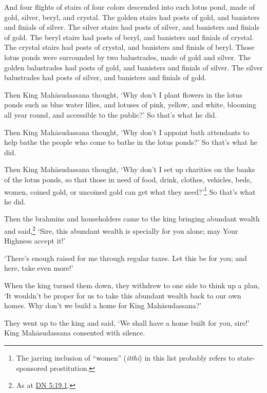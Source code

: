 \documentclass[12pt,openany]{book}%
\begin{document}
And four flights of stairs of four colors descended into each lotus pond, made of gold, silver, beryl, and crystal. The golden stairs had posts of gold, and banisters and finials of silver. The silver stairs had posts of silver, and banisters and finials of gold. The beryl stairs had posts of beryl, and banisters and finials of crystal. The crystal stairs had posts of crystal, and banisters and finials of beryl. Those lotus ponds were surrounded by two balustrades, made of gold and silver. The golden balustrades had posts of gold, and banisters and finials of silver. The silver balustrades had posts of silver, and banisters and finials of gold. 

Then King \textsanskrit{Mahāsudassana} thought, ‘Why don’t I plant flowers in the lotus ponds such as blue water lilies, and lotuses of pink, yellow, and white, blooming all year round, and accessible to the public?’ So that’s what he did. 

Then King \textsanskrit{Mahāsudassana} thought, ‘Why don’t I appoint bath attendants to help bathe the people who come to bathe in the lotus ponds?’ So that’s what he did. 

Then King \textsanskrit{Mahāsudassana} thought, ‘Why don’t I set up charities on the banks of the lotus ponds, so that those in need of food, drink, clothes, vehicles, beds, women, coined gold, or uncoined gold can get what they need?’\footnote{The jarring inclusion of “women” (\textit{\textsanskrit{itthī}}) in this list probably refers to state-sponsored prostitution. } So that’s what he did. 

Then the brahmins and householders came to the king bringing abundant wealth and said,\footnote{As at \href{https://suttacentral.net/dn5/en/sujato\#19.1}{DN 5:19.1}. } ‘Sire, this abundant wealth is specially for you alone; may Your Highness accept it!’ 

‘There’s enough raised for me through regular taxes. Let this be for you; and here, take even more!’ 

When the king turned them down, they withdrew to one side to think up a plan, ‘It wouldn’t be proper for us to take this abundant wealth back to our own homes. Why don’t we build a home for King \textsanskrit{Mahāsudassana}?’ 

They went up to the king and said, ‘We shall have a home built for you, sire!’ King \textsanskrit{Mahāsudassana} consented with silence. 
\end{document}
